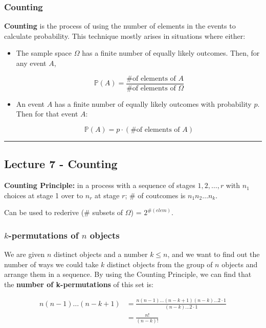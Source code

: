 \documentclass{article}
\begin{document}
\subsubsection{Counting}

\textbf{Counting} is the process of using the number of elements in
the events to calculate probability. This technique mostly arises in
situations where either:

\begin{itemize}
\item The sample space $\Omega$ has a finite number of equally likely
  outcomes. Then, for any event $A$,

  \[
    \mathbb{P}(A) = \frac{\text{\# of elements of } A}
    {\text{\# of elements of } \Omega}
  \]

\item An event $A$ has a finite number of equally likely outcomes with
  probability $p$. Then for that event $A$:

  \[
    \mathbb{P}(A) = p \cdot (\text{\# of elements of }A)
  \]
\end{itemize}


\medskip\hrule
\subsection{Lecture 7 - Counting}

\textbf{Counting Principle:} in a process with a sequence of stages
$1, 2, \dots, r$ with $n_1$ choices at stage 1 over to $n_r$ at stage
$r$; \# of coutcomes is $n_1 n_2 \dots n_k$.

Can be used to rederive (\# subsets of $\Omega$) = $2^{\#(elem)}$.

\bigskip
\subsubsection{$k$-permutations of $n$ objects}

We are given $n$ distinct objects and a number $k \leq n$, and we want
to find out the number of ways we could take $k$ distinct objects from
the group of $n$ objects and arrange them in a sequence. By using the
Counting Principle, we can find that the \textbf{number of
  k-permutations} of this set is:

\begin{equation}
  \tag{K-permutations}
  \boxed{
    \begin{aligned}
      n (n-1) \dots (n-k+1)
      &= \frac{n (n-1) \dots (n-k+1) (n-k) \dots 2 \cdot 1}{(n-k)
        \dots 2 \cdot 1} \\
      &= \frac{n!}{(n-k)!}
    \end{aligned}
  }
\end{equation}
\end{document}
